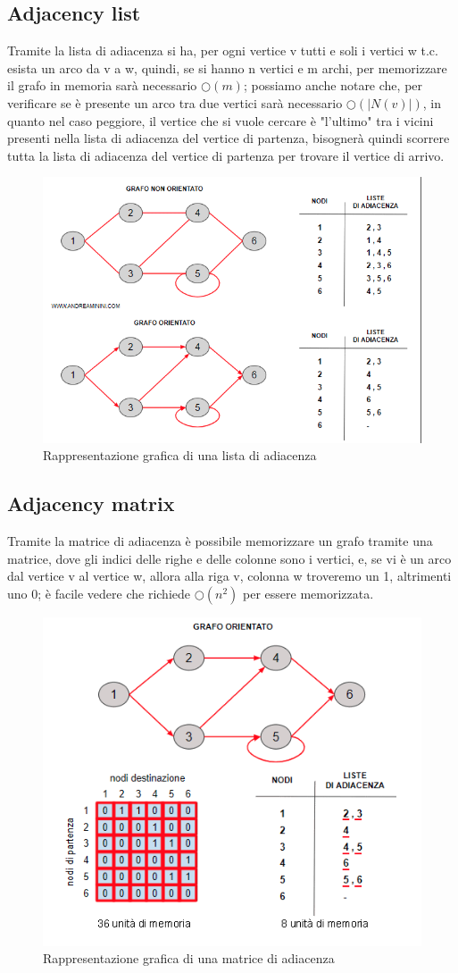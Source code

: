 \documentclass[12pt,a4paper]{article}
\begin{document}
\subsection{Adjacency list}
Tramite la lista di adiacenza si ha, per ogni vertice v tutti e soli i vertici w t.c. esista un arco da v a w, quindi, se si hanno n vertici e m archi, per memorizzare il grafo in memoria sarà necessario $\bigcirc(m)$; possiamo anche notare che, per verificare se è presente un arco tra due vertici sarà necessario $\bigcirc(\vert N(v) \vert)$, in quanto nel caso peggiore, il vertice che si vuole cercare è "l'ultimo" tra i vicini presenti nella lista di adiacenza del vertice di partenza, bisognerà quindi scorrere tutta la lista di adiacenza del vertice di partenza per trovare il vertice di arrivo.
\begin{figure}[h]
	\centering
	\includegraphics[width=0.7\linewidth]{img/lista_adiacenza}
	\caption{Rappresentazione grafica di una lista di adiacenza}
	\label{fig:2}
\end{figure}

\subsection{Adjacency matrix}
Tramite la matrice di adiacenza è possibile memorizzare un grafo tramite una matrice, dove gli indici delle righe e delle colonne sono i vertici, e, se vi è un arco dal vertice v al vertice w, allora alla riga v, colonna w troveremo un 1, altrimenti uno 0; è facile vedere che richiede $\bigcirc(n^{2})$ per essere memorizzata.
\begin{figure}[h]
	\centering
	\includegraphics[width=0.7\linewidth]{img/matrice_adiacenza}
	\caption{Rappresentazione grafica di una matrice di adiacenza}
	\label{fig:3}
\end{figure}
\end{document}
